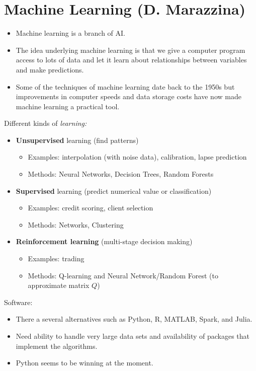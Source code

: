 
\chapter{Machine Learning (D. Marazzina)}

\begin{itemize}
    \item Machine learning is a branch of AI.
    \item The idea underlying machine learning is that we give a computer program access to lots of data and let it learn about relationships between variables and make predictions.
    \item Some of the techniques of machine learning date back to the 1950s but improvements in computer speeds and data storage costs have now made machine learning a practical tool.
\end{itemize}

Different kinds of \textit{learning:}
\begin{itemize}
    \item \textbf{Unsupervised} learning (find patterns)
          \begin{itemize}
              \item Examples: interpolation (with noise data), calibration, lapse prediction 
              \item Methods: Neural Networks, Decision Trees, Random Forests
          \end{itemize}
    \item \textbf{Supervised} learning (predict numerical value or classification)
          \begin{itemize}
              \item Examples: credit scoring, client selection
              \item Methods: Networks, Clustering
          \end{itemize}
    \item \textbf{Reinforcement learning} (multi-stage decision making)
          \begin{itemize}
              \item Examples: trading
              \item Methods: Q-learning and Neural Network/Random Forest (to approximate matrix $Q$)
          \end{itemize}
\end{itemize}

Software:
\begin{itemize}
    \item There a several alternatives such as Python, R, MATLAB, Spark, and Julia.
    \item Need ability to handle very large data sets and availability of packages that implement the algorithms.
    \item Python seems to be winning at the moment.
\end{itemize}

